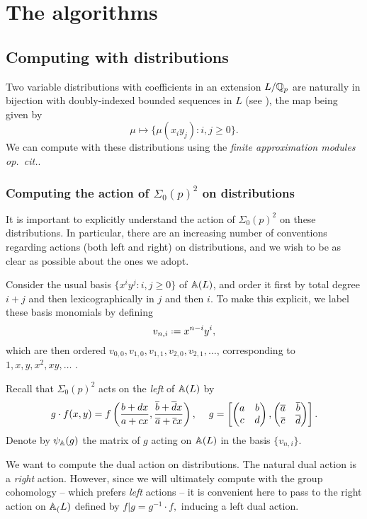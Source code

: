 \documentclass[a4paper,10pt]{article}
\numberwithin{equation}{section}
\begin{document}
\section{The algorithms}


\subsection{Computing with distributions}
Two variable distributions with coefficients in an extension $L/\mathbb{Q}_p$ are naturally in bijection with doubly-indexed bounded sequences in $L$ (see \cite[Proposition 3.6]{Wil17}), the map being given by
\[
 \mu \mapsto \{\mu(x_iy_j) : i,j \geq 0\}. 
\]
We can compute with these distributions using the \emph{finite approximation modules} \emph{op.\ cit.}.

\subsubsection{Computing the action of \texorpdfstring{$\Sigma_0(p)^2$}{S0(p)2} on distributions}

It is important to explicitly understand the action of $\Sigma_0(p)^2$ on these distributions. In particular, there are an increasing number of conventions regarding actions (both left and right) on distributions, and we wish to be as clear as possible about the ones we adopt.
\begin{definition}
Consider the usual basis $\{x^iy^j : i,j \geq 0\}$ of $\mathbb{A}(L)$, and order it first by total degree $i+j$ and then lexicographically in $j$ and then $i$. To make this explicit, we label these basis monomials by defining
\[
	v_{n,i} \defeq x^{n-i}y^{i},
 \]
which are then ordered $v_{0,0}, v_{1,0},v_{1,1},v_{2,0},v_{2,1},\dots$, corresponding to $1,x,y,x^2,xy,\dots$ .
\end{definition}
Recall that $\Sigma_0(p)^2$ acts on the \emph{left} of $\mathbb{A}(L)$ by
\[
	g \cdot f(x,y) = f\left(\frac{b+dx}{a+cx},\frac{\overline{b}+\overline{d}x}{\overline{a} + \overline{c}x}\right), \hspace{12pt} g = \left[\begin{pmatrix}a & b\\c & d\end{pmatrix},\begin{pmatrix}\overline{a} & \overline{b}\\\overline{c} & \overline{d}\end{pmatrix}\right].
\]
Denote by $\psi_{\mathbb{A}}(g)$ the matrix of $g$ acting on $\mathbb{A}(L)$ in the basis $
\{v_{n,i}\}$.

We want to compute the dual action on distributions. The natural dual action is a \emph{right} action. However, since we will ultimately compute with the group cohomology -- which prefers \emph{left} actions -- it is convenient here to pass to the right action on $\mathbb{A}_(L)$ defined by $f|g = g^{-1}\cdot f,$ inducing a left dual action. 
\end{document}

